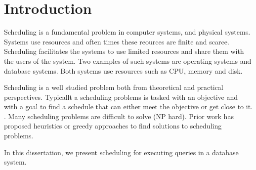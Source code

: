 \chapter{Introduction}
Scheduling is a fundamental problem in computer systems, and physical systems. 
Systems use resources and often times these reources are finite and scarce. 
Scheduling facilitates the systems to use limited resources and share them with the users of the system.
Two examples of such systems are operating systems and database systems. 
Both systems use resources such as CPU, memory and disk.

Scheduling is a well studied problem both from theoretical and practical perspectives. 
Typicallt a scheduling problems is tasked with an objective and with a goal to find a schedule that can either meet the objective or get close to it.
.
Many scheduling problems are difficult to solve (NP hard).
Prior work has proposed heuristics or greedy approaches to find solutions to scheduling problems. 

In this dissertation, we present scheduling for executing queries in a database system.


